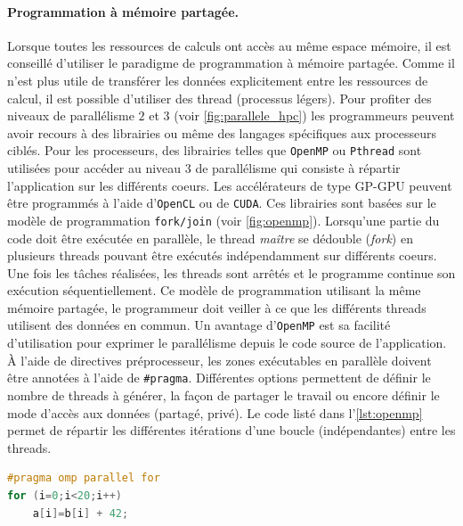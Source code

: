                
           
        \paragraph{Programmation à mémoire partagée.} \label{sec:prog_partagee}
            
            Lorsque toutes les ressources de calculs ont accès au même espace mémoire, il est conseillé d'utiliser le paradigme de programmation à mémoire partagée. Comme il n'est plus utile de transférer les données explicitement entre les ressources de calcul, il est possible d'utiliser des \gls{thread} (processus légers). Pour profiter des niveaux de parallélisme $2$ et $3$ (voir \autoref{fig:parallele_hpc}) les programmeurs peuvent avoir recours à des librairies ou même des langages spécifiques aux processeurs ciblés. Pour les processeurs, des librairies telles que \verb|OpenMP| ou \verb|Pthread| sont utilisées pour accéder au niveau $3$ de parallélisme qui consiste à répartir l'application sur les différents coeurs. Les accélérateurs de type GP-GPU peuvent être programmés à l'aide d'\verb|OpenCL| ou de \verb|CUDA|. Ces librairies sont basées sur le modèle de programmation \verb|fork/join| (voir \autoref{fig:openmp}). Lorsqu'une partie du code doit être exécutée en parallèle, le thread \textit{maître} se dédouble (\textit{fork}) en plusieurs threads pouvant être exécutés indépendamment sur différents coeurs. Une fois les tâches réalisées, les threads sont arrêtés et le programme continue son exécution séquentiellement. Ce modèle de programmation utilisant la même mémoire partagée, le programmeur doit veiller à ce que les différents threads utilisent des données en commun. Un avantage d'\verb|OpenMP| est sa facilité d'utilisation pour exprimer le parallélisme depuis le code source de l'application. À l'aide de directives préprocesseur, les zones exécutables en parallèle doivent être annotées à l'aide de \verb|#pragma|. Différentes options permettent de définir le nombre de threads à générer, la façon de partager le travail ou encore définir le mode d'accès aux données (partagé, privé). Le code listé dans l'\autoref{lst:openmp} permet de répartir les différentes itérations d'une boucle (indépendantes) entre les threads.
            
\begin{lstlisting}[language=C, caption=Distribution des itérations d'une boucle à l'aide d'OpenMP, label=lst:openmp]
#pragma omp parallel for
for (i=0;i<20;i++)
    a[i]=b[i] + 42;
\end{lstlisting}

